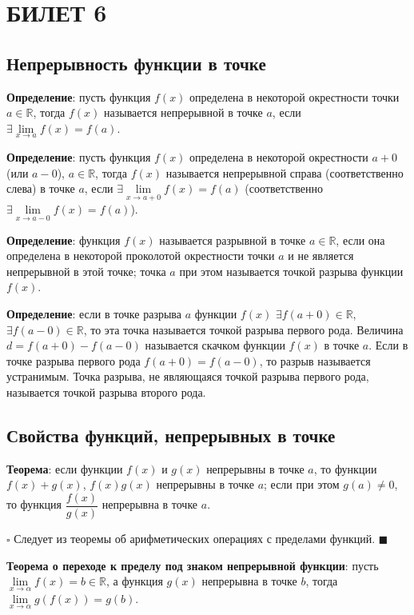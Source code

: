 \documentclass[12pt, a4paper, reqno]{article}
\begin{document}
\newpage
\section{БИЛЕТ 6}

\subsection{Непрерывность функции в точке}

    \textbf{Определение}: пусть функция $f(x)$ определена в некоторой окрестности точки
    $a\in\mathbb{R}$, тогда $f(x)$ называется непрерывной в точке $a$, если
    $\exists\lim\limits_{x\to a} f(x) = f(a)$.

    \textbf{Определение}: пусть функция $f(x)$ определена в некоторой окрестности $a + 0$ (или
    $a - 0$), $a\in\mathbb{R}$, тогда $f(x)$ называется непрерывной справа (соответственно слева) в
    точке $a$, если $\exists\lim\limits_{x\to a + 0} f(x) = f(a)$ (соответственно
    $\exists\lim\limits_{x\to a - 0} f(x) = f(a)$).

    \textbf{Определение}: функция $f(x)$ называется разрывной в точке $a\in\mathbb{R}$, если она
    определена в некоторой проколотой окрестности точки $a$ и не является непрерывной в этой точке;
    точка $a$ при этом называется точкой разрыва функции $f(x)$.

    \textbf{Определение}: если в точке разрыва $a$ функции $f(x)$ $\exists f(a + 0)\in\mathbb{R}$,
    $\exists f(a - 0)\in\mathbb{R}$, то эта точка называется точкой разрыва первого рода. Величина
    $d = f(a + 0) - f(a - 0)$ называется скачком функции $f(x)$ в точке $a$. Если в точке разрыва
    первого рода $f(a + 0) = f(a - 0)$, то разрыв называется устранимым. Точка разрыва, не
    являющаяся точкой разрыва первого рода, называется точкой разрыва второго рода.

\subsection{Свойства функций, непрерывных в точке}

    \textbf{Теорема}: если функции $f(x)$ и $g(x)$ непрерывны в точке $a$, то функции $f(x) + g(x)$,
    $f(x)g(x)$ непрерывны в точке $a$; если при этом $g(a) \neq 0$, то функция $\dfrac{f(x)}{g(x)}$
    непрерывна в точке $a$.

    $\square$ Следует из теоремы об арифметических операциях с пределами функций. $\blacksquare$

    \textbf{Теорема о переходе к пределу под знаком непрерывной функции}: пусть
    $\lim\limits_{x\to\alpha} f(x) = b\in\mathbb{R}$, а функция $g(x)$ непрерывна в точке $b$, тогда
    $\lim\limits_{x\to\alpha} g(f(x)) = g(b)$.
\end{document}
